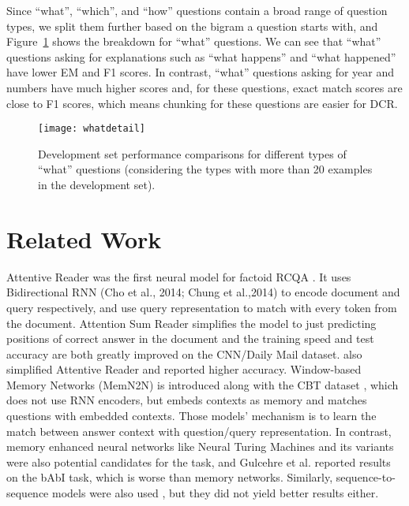 \documentclass[letterpaper]{article}
\begin{document}
Since ``what'', ``which'', and ``how'' questions contain a broad range of question types, we split them further based on the bigram a question starts with, and Figure~\ref{whatdetail} shows the breakdown for ``what'' questions. We can see that ``what'' questions asking for explanations such as ``what happens'' and ``what happened'' have lower EM and F1 scores. In contrast, ``what'' questions asking for year and numbers have much higher scores and, for these questions, exact match scores are close to F1 scores, which means chunking for these questions are easier for DCR.

\begin{figure}
\begin{center}
\texttt{[image: whatdetail]}
\caption{Development set performance comparisons for different types of ``what'' questions (considering the types with more than 20 examples in the development set).}
\label{whatdetail}
\end{center}
\end{figure}

\section{Related Work}
\label{sect_related}










Attentive Reader was the first neural model for factoid RCQA \cite{hermann2015teaching}. It uses Bidirectional RNN (Cho et al., 2014; Chung et al.,2014) to encode document and query respectively, and use query representation to match with every token from the document. Attention Sum Reader \cite{kadlec2016text} simplifies the model to just predicting positions of correct answer in the document and the training speed and test accuracy are both greatly improved on the CNN/Daily Mail dataset. \cite{chen2016thorough} also simplified Attentive Reader and reported higher accuracy. Window-based Memory Networks (MemN2N) is introduced along with the CBT dataset \cite{hill2015goldilocks}, which does not use RNN encoders, but embeds contexts as memory and matches questions with embedded contexts. 
Those models' mechanism is to learn the match between answer context with question/query representation. In contrast, memory enhanced neural networks  like Neural Turing Machines \cite{graves2014neural} and its variants \cite{zhang2015structured,gulcehre2016dynamic,zaremba2015reinforcement} were also potential candidates for the task, and Gulcehre et al.  reported results on the bAbI task, which is worse than memory networks. Similarly, sequence-to-sequence models were also used \cite{yu2015empirical,hermann2015teaching}, but they did not yield better results either. 
\end{document}
